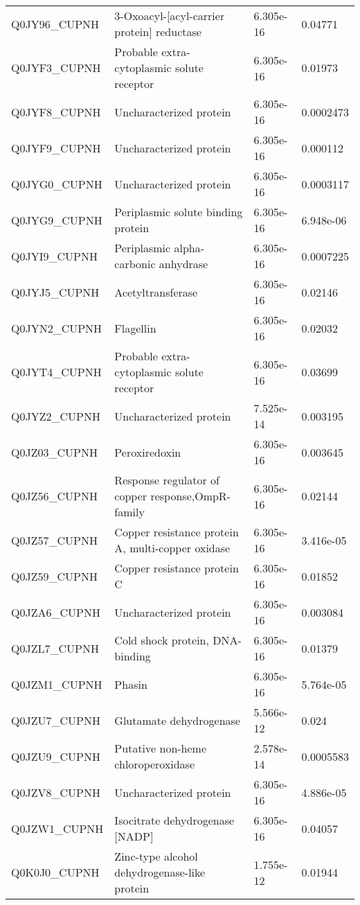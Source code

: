 \begin{center}
\begin{longtable}{ l l l l }
Q0JY96\_CUPNH & 3-Oxoacyl-[acyl-carrier protein] reductase& 6.305e-16 & 0.04771 \\ [0.5ex]
Q0JYF3\_CUPNH & Probable extra-cytoplasmic solute receptor& 6.305e-16 & 0.01973 \\ [0.5ex]
Q0JYF8\_CUPNH & Uncharacterized protein& 6.305e-16 & 0.0002473 \\ [0.5ex]
Q0JYF9\_CUPNH & Uncharacterized protein& 6.305e-16 & 0.000112 \\ [0.5ex]
Q0JYG0\_CUPNH & Uncharacterized protein& 6.305e-16 & 0.0003117 \\ [0.5ex]
Q0JYG9\_CUPNH & Periplasmic solute binding protein& 6.305e-16 & 6.948e-06 \\ [0.5ex]
Q0JYI9\_CUPNH & Periplasmic alpha-carbonic anhydrase& 6.305e-16 & 0.0007225 \\ [0.5ex]
Q0JYJ5\_CUPNH & Acetyltransferase& 6.305e-16 & 0.02146 \\ [0.5ex]
Q0JYN2\_CUPNH & Flagellin& 6.305e-16 & 0.02032 \\ [0.5ex]
Q0JYT4\_CUPNH & Probable extra-cytoplasmic solute receptor& 6.305e-16 & 0.03699 \\ [0.5ex]
Q0JYZ2\_CUPNH & Uncharacterized protein& 7.525e-14 & 0.003195 \\ [0.5ex]
Q0JZ03\_CUPNH & Peroxiredoxin& 6.305e-16 & 0.003645 \\ [0.5ex]
Q0JZ56\_CUPNH & Response regulator of copper response,OmpR-family& 6.305e-16 & 0.02144 \\ [0.5ex]
Q0JZ57\_CUPNH & Copper resistance protein A, multi-copper oxidase& 6.305e-16 & 3.416e-05 \\ [0.5ex]
Q0JZ59\_CUPNH & Copper resistance protein C& 6.305e-16 & 0.01852 \\ [0.5ex]
Q0JZA6\_CUPNH & Uncharacterized protein& 6.305e-16 & 0.003084 \\ [0.5ex]
Q0JZL7\_CUPNH & Cold shock protein, DNA-binding& 6.305e-16 & 0.01379 \\ [0.5ex]
Q0JZM1\_CUPNH & Phasin& 6.305e-16 & 5.764e-05 \\ [0.5ex]
Q0JZU7\_CUPNH & Glutamate dehydrogenase& 5.566e-12 & 0.024 \\ [0.5ex]
Q0JZU9\_CUPNH & Putative non-heme chloroperoxidase& 2.578e-14 & 0.0005583 \\ [0.5ex]
Q0JZV8\_CUPNH & Uncharacterized protein& 6.305e-16 & 4.886e-05 \\ [0.5ex]
Q0JZW1\_CUPNH & Isocitrate dehydrogenase [NADP]& 6.305e-16 & 0.04057 \\ [0.5ex]
Q0K0J0\_CUPNH & Zinc-type alcohol dehydrogenase-like protein& 1.755e-12 & 0.01944 \\ [0.5ex]

\end{longtable}
\end{center}
